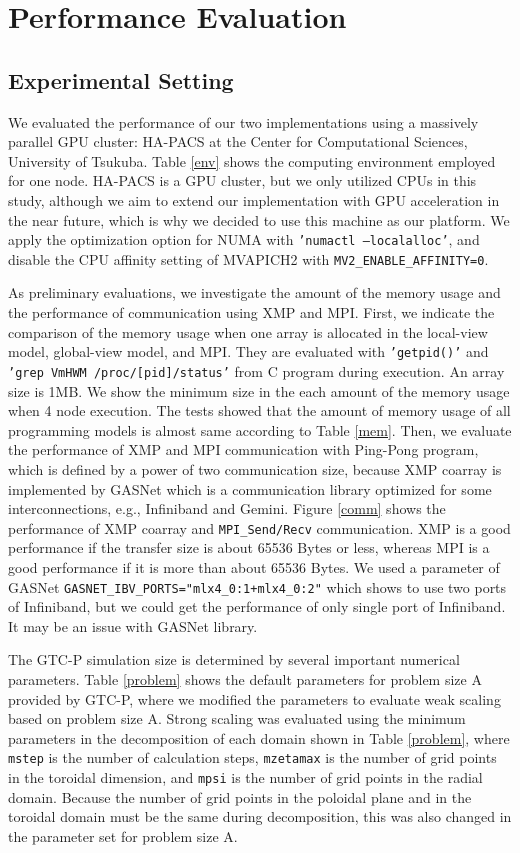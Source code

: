 \section{Performance Evaluation\label{sec4}}

\subsection{Experimental Setting}
We evaluated the performance of our two implementations using a massively parallel GPU cluster: HA-PACS\cite{HAPACS} at the Center for Computational Sciences, University of Tsukuba. Table \ref{env} shows the computing environment employed for one node. HA-PACS is a GPU cluster, but we only utilized CPUs in this study, although we aim to extend our implementation with GPU acceleration in the near future, which is why we decided to use this machine as our platform. We apply the optimization option for NUMA with {\tt 'numactl --localalloc'}, and disable the CPU affinity setting of MVAPICH2 with {\tt MV2\_ENABLE\_AFFINITY=0}.

As preliminary evaluations, we investigate the amount of the memory usage and the performance of communication using XMP and MPI. First, we indicate the comparison of the memory usage when one array is allocated in the local-view model, global-view model, and MPI. They are evaluated with {\tt 'getpid()'} and {\tt 'grep VmHWM /proc/[pid]/status'} from C program during execution. An array size is 1MB. We show the minimum size in the each amount of the memory usage when 4 node execution. The tests showed that the amount of memory usage of all programming models is almost same according to Table \ref{mem}. Then, we evaluate the performance of XMP and MPI communication with Ping-Pong program, which is defined by a power of two communication size, because XMP coarray is implemented by GASNet\cite{GASNET} which is a communication library optimized for some interconnections, e.g., Infiniband and Gemini. Figure \ref{comm} shows the performance of XMP coarray and {\tt MPI\_Send/Recv} communication. XMP is a good performance if the transfer size is about 65536 Bytes or less, whereas MPI is a good performance if it is more than about 65536 Bytes. We used a parameter of GASNet {\tt GASNET\_IBV\_PORTS="mlx4\_0:1+mlx4\_0:2"} which shows to use two ports of Infiniband, but we could get the performance of only single port of Infiniband. It may be an issue with GASNet library.

The GTC-P simulation size is determined by several important numerical parameters. Table \ref{problem} shows the default parameters for problem size A provided by GTC-P, where we modified the parameters to evaluate weak scaling based on problem size A. Strong scaling was evaluated using the minimum parameters in the decomposition of each domain shown in Table \ref{problem}, where {\tt mstep} is the number of calculation steps, {\tt mzetamax} is the number of grid points in the toroidal dimension, and {\tt mpsi} is the number of grid points in the radial domain. Because the number of grid points in the poloidal plane and in the toroidal domain must be the same during decomposition, this was also changed in the parameter set for problem size A. 

